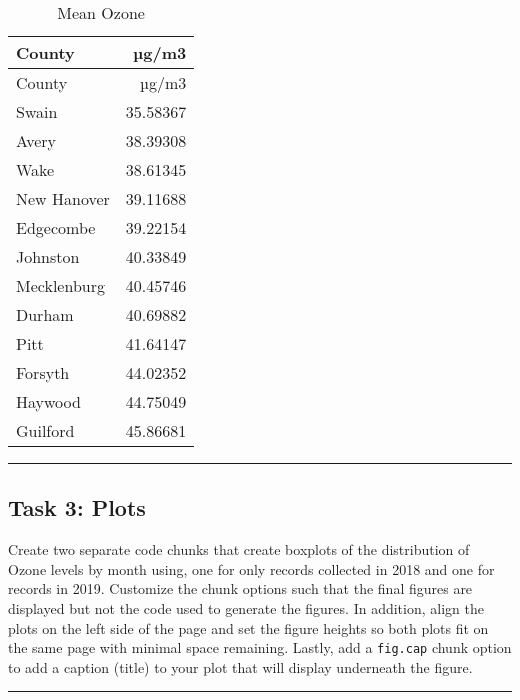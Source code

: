 \documentclass[
]{article}
\begin{document}
\begin{longtable}[]{@{}lr@{}}
\caption{Mean Ozone}\tabularnewline
\toprule\noalign{}
County & µg/m3 \\
\midrule\noalign{}
\endfirsthead
\toprule\noalign{}
County & µg/m3 \\
\midrule\noalign{}
\endhead
\bottomrule\noalign{}
\endlastfoot
Swain & 35.58367 \\
Avery & 38.39308 \\
Wake & 38.61345 \\
New Hanover & 39.11688 \\
Edgecombe & 39.22154 \\
Johnston & 40.33849 \\
Mecklenburg & 40.45746 \\
Durham & 40.69882 \\
Pitt & 41.64147 \\
Forsyth & 44.02352 \\
Haywood & 44.75049 \\
Guilford & 45.86681 \\
\end{longtable}

\begin{center}\rule{0.5\linewidth}{0.5pt}\end{center}

\hypertarget{task-3-plots}{%
\subsection{Task 3: Plots}\label{task-3-plots}}

Create two separate code chunks that create boxplots of the distribution
of Ozone levels by month using, one for only records collected in 2018
and one for records in 2019. Customize the chunk options such that the
final figures are displayed but not the code used to generate the
figures. In addition, align the plots on the left side of the page and
set the figure heights so both plots fit on the same page with minimal
space remaining. Lastly, add a \texttt{fig.cap} chunk option to add a
caption (title) to your plot that will display underneath the figure.

\begin{center}\rule{0.5\linewidth}{0.5pt}\end{center}
\end{document}
